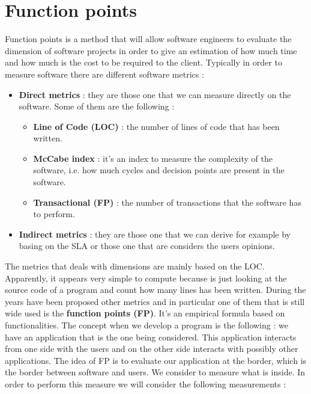 \documentclass[11pt]{article}
\begin{document}
\section{Function points}
Function points is a method that will allow software engineers to evaluate the dimension of software projects in order to give an estimation of how much time and how much is the cost to be required to the client. Typically in order to measure software there are different software metrics :
\begin{itemize}
\item \textbf{Direct metrics} : they are those one that we can measure directly on the software. Some of them are the following :
\begin{itemize}
\item \textbf{Line of Code (LOC)} : the number of lines of code that has been written.
\item \textbf{McCabe index} : it's an index to measure the complexity of the software, i.e. how much cycles and decision points are present in the software.
\item \textbf{Transactional (FP)} : the number of transactions that the software has to perform. 
\end{itemize}
\item \textbf{Indirect metrics} : they are those one that we can derive for example by basing on the SLA or those one that are considers the users opinions.
\end{itemize}
The metrics that deals with dimensions are mainly based on the LOC. Apparently, it appears very simple to compute because is just looking at the source code of a program and count how many lines has been written. During the years have been proposed other metrics and in particular one of them that is still wide used is the \textbf{function points (FP)}. It's an empirical formula based on functionalities. The concept when we develop a program is the following : we have an application that is the one being considered. This application interacts from one side with the users and on the other side interacts with possibly other applications. The idea of FP is to evaluate our application at the border, which is the border between software and users. We consider to measure what is inside. In order to perform this measure we will consider the following measurements : 
\end{document}
